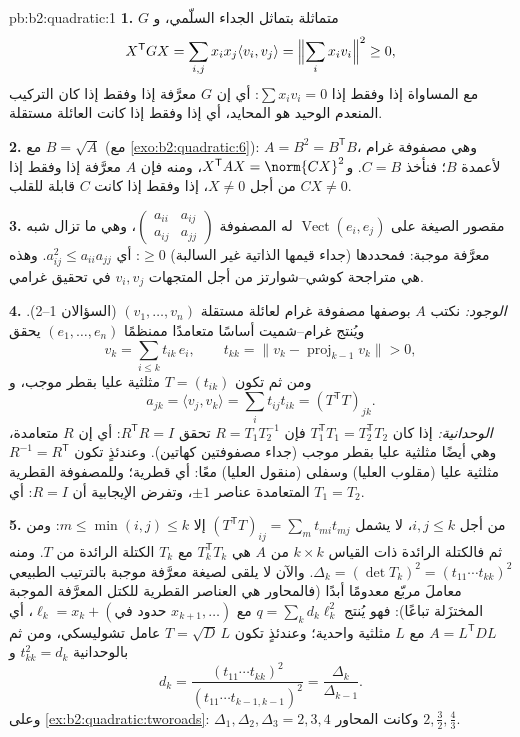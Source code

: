 \begin{solution}{pb:b2:quadratic:1}
\textbf{1.} $G$ متماثلة بتماثل الجداء السلّمي،
و
\[
X^{\mathsf T}GX = \sum_{i,j}x_ix_j\langle v_i, v_j\rangle
= \Bigl\|\sum_i x_iv_i\Bigr\|^2 \geq 0 ,
\]
مع المساواة إذا وفقط إذا $\sum x_iv_i = 0$: أي إن $G$ معرَّفة إذا وفقط إذا كان
التركيب المنعدم الوحيد هو المحايد، أي إذا وفقط إذا كانت العائلة
مستقلة.

\textbf{2.} مع $B = \sqrt A$ (مع \cref{exo:b2:quadratic:6}): $A
= B^2 = B^{\mathsf T}B$، وهي مصفوفة غرام لأعمدة $B$؛
فنأخذ $C = B$. و$X^{\mathsf T}AX = \norm{CX}^2$، ومنه فإن $A$
معرَّفة إذا وفقط إذا $CX \neq 0$ من أجل $X \neq 0$، إذا وفقط إذا كانت $C$ قابلة للقلب.

\textbf{3.} مقصور الصيغة على
$\operatorname{Vect}(e_i, e_j)$ له المصفوفة
$\begin{pmatrix} a_{ii} & a_{ij}\\ a_{ij} & a_{jj}
\end{pmatrix}$، وهي ما تزال شبه معرَّفة موجبة: فمحددها
(جداء قيمها الذاتية غير السالبة) $\geq 0$:
أي $a_{ij}^2 \leq a_{ii}a_{jj}$. وهذه هي متراجحة كوشي--شوارتز من أجل
المتجهات $v_i, v_j$ في تحقيق غرامي.

\textbf{4.} \emph{الوجود:} نكتب $A$ بوصفها مصفوفة غرام
لعائلة مستقلة $(v_1, \dots, v_n)$ (السؤالان 1--2).
ويُنتج غرام--شميت أساسًا متعامدًا ممنظمًا $(e_1, \dots, e_n)$ يحقق
\[
v_k = \sum_{i \leq k} t_{ik}\,e_i,
\qquad t_{kk} = \bigl\| v_k - \operatorname{proj}_{k-1}v_k
\bigr\| > 0 ,
\]
ومن ثم تكون $T = (t_{ik})$ مثلثية عليا بقطر موجب،
و
\[
a_{jk} = \langle v_j, v_k\rangle
= \sum_i t_{ij}t_{ik} = (T^{\mathsf T}T)_{jk} .
\]
\emph{الوحدانية:} إذا كان $T_1^{\mathsf T}T_1 = T_2^{\mathsf T}T_2$
فإن $R = T_1T_2^{-1}$ تحقق $R^{\mathsf T}R = I$: أي إن $R$
متعامدة، وهي أيضًا مثلثية عليا بقطر موجب
(جداء مصفوفتين كهاتين). وعندئذٍ تكون $R^{-1} = R^{\mathsf T}$
مثلثية عليا (مقلوب العليا) وسفلى (منقول
العليا) معًا: أي قطرية؛ وللمصفوفة القطرية المتعامدة
عناصر $\pm1$، وتفرض الإيجابية أن $R = I$: أي $T_1 = T_2$.

\textbf{5.} من أجل $i, j \leq k$، لا يشمل $(T^{\mathsf T}T)_{ij} = \sum_m
t_{mi}t_{mj}$ إلا $m \leq \min(i,j) \leq k$: ومن ثم فالكتلة
الرائدة ذات القياس $k\times k$ من $A$ هي $T_k^{\mathsf T}T_k$ مع
$T_k$ الكتلة الرائدة من $T$. ومنه $\Delta_k = (\det T_k)^2
= (t_{11}\cdots t_{kk})^2$. والآن لا يلقى  لصيغة
معرَّفة موجبة بالترتيب الطبيعي معاملَ مربّع معدومًا أبدًا
(فالمحاور هي العناصر القطرية للكتل المعرَّفة الموجبة
المختزَلة تباعًا): فهو يُنتج $q
= \sum_k d_k\ell_k^2$ مع $\ell_k = x_k + (\text{حدود في }
x_{k+1}, \dots)$، أي $A = L^{\mathsf T}DL$ مع $L$
مثلثية واحدية؛ وعندئذٍ تكون $T = \sqrt D\,L$ عامل
تشوليسكي، ومن ثم بالوحدانية $t_{kk}^2 = d_k$ و
\[
d_k = \frac{(t_{11}\cdots t_{kk})^2}
{(t_{11}\cdots t_{k-1,k-1})^2}
= \frac{\Delta_k}{\Delta_{k-1}} .
\]
وعلى \cref{ex:b2:quadratic:tworoads}: $\Delta_1, \Delta_2,
\Delta_3 = 2, 3, 4$ وكانت المحاور $2, \frac32, \frac43$.


\end{solution}
